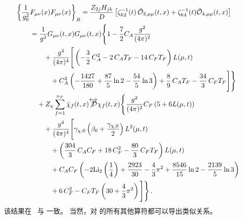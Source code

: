 \begin{equation}
  \begin{split}
    \bigg\{\frac{1}{g_0^2}&F_{\mu\nu}(x)F_{\mu\nu}(x)\bigg\}_R =
    \frac{Z_{2j}H_{jk}}{D}\left[\zeta_{k2}^{-1}(t)\,\tcalo_{2,\mu\mu}(t,x) +
      \zeta_{k4}^{-1}(t)\tcalo_{4,\mu\mu}(t,x)\right]\\
    &=\frac{1}{g^2} G_{\mu\nu}(t,x)G_{\mu\nu}(t,x) \Bigg\{ 1 -
         \frac{7}{2} C_A \gcoup{2} \\
      & \qquad + \gcoup{4}\Bigg[ \left( - \frac{3}{2}\, C_A^2 - 2\, C_A T_F - 14\, C_F T_F \right) L(\mu, t) \\
      & \qquad \quad + C_A^2 \left( - \frac{1427}{180} + \frac{87}{5} \ln 2 - \frac{54}{5} \ln 3 \right) + \frac{8}{9}\, C_A T_F - \frac{34}{3}\, C_F T_F \Bigg] \Bigg\} \\
    & \quad+ Z_\chi \sum_{f=1}^{n_F}\bar\chi_f(t,x) \overleftrightarrow{\slashed{\mathcal{D}}}\chi_{f}(t,x) \Bigg\{ \gcoup{2}C_F\left(5 + 6 L (\mu, t)\right) \\
    & \qquad + \gcoup{4} \Bigg[ \gamma_{\chi, 0} \left( \beta_0 + \frac{\gamma_{\chi, 0}}{2} \right) L^2(\mu, t) \\
    & \qquad\quad + \left( \frac{304}{3}\, C_A C_F + 18\, C_F^2 - \frac{80}{3}\, C_F T_F \right) L (\mu, t) \\
    & \qquad \quad+ C_A C_F \left( - 2 \text{Li}_2 \left( \frac{1}{4} \right) + \frac{2923}{30} - \frac{4}{3} \pi^2 + \frac{8546}{15} \ln 2 - \frac{2139}{5} \ln 3 \right) \\
    & \qquad\quad + 6\, C_F^2 - C_F T_F \left( 30 + \frac{4}{3} \pi^2 \right) \Bigg]
    \Bigg\}\,.
  \end{split}
\end{equation}
该结果在 \nlo\ 与  一致。
当然，对  的所有其他算符都可以导出类似关系。
